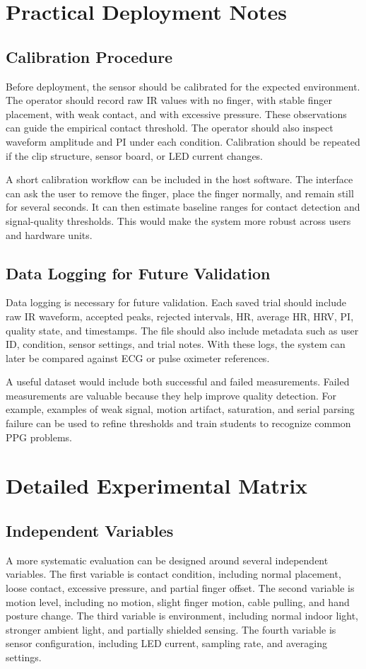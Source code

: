 \documentclass[10pt,conference]{IEEEtran}
\begin{document}
\section{Practical Deployment Notes}
\subsection{Calibration Procedure}
Before deployment, the sensor should be calibrated for the expected environment. The operator should record raw IR values with no finger, with stable finger placement, with weak contact, and with excessive pressure. These observations can guide the empirical contact threshold. The operator should also inspect waveform amplitude and PI under each condition. Calibration should be repeated if the clip structure, sensor board, or LED current changes.

A short calibration workflow can be included in the host software. The interface can ask the user to remove the finger, place the finger normally, and remain still for several seconds. It can then estimate baseline ranges for contact detection and signal-quality thresholds. This would make the system more robust across users and hardware units.

\subsection{Data Logging for Future Validation}
Data logging is necessary for future validation. Each saved trial should include raw IR waveform, accepted peaks, rejected intervals, HR, average HR, HRV, PI, quality state, and timestamps. The file should also include metadata such as user ID, condition, sensor settings, and trial notes. With these logs, the system can later be compared against ECG or pulse oximeter references.

A useful dataset would include both successful and failed measurements. Failed measurements are valuable because they help improve quality detection. For example, examples of weak signal, motion artifact, saturation, and serial parsing failure can be used to refine thresholds and train students to recognize common PPG problems.


\section{Detailed Experimental Matrix}
\subsection{Independent Variables}
A more systematic evaluation can be designed around several independent variables. The first variable is contact condition, including normal placement, loose contact, excessive pressure, and partial finger offset. The second variable is motion level, including no motion, slight finger motion, cable pulling, and hand posture change. The third variable is environment, including normal indoor light, stronger ambient light, and partially shielded sensing. The fourth variable is sensor configuration, including LED current, sampling rate, and averaging settings.
\end{document}
